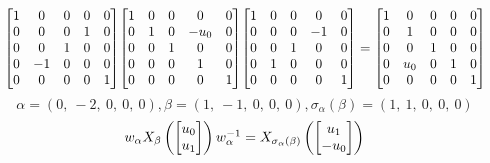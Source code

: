 \documentclass[11pt]{article}
\theoremstyle{definition}
\begin{document}
\[
\scaletoalign{\textwidth}{{\left[\begin{matrix}1 & 0 & 0 & 0 & 0\\0 & 0 & 0 & 1 & 0\\0 & 0 & 1 & 0 & 0\\0 & -1 & 0 & 0 & 0\\0 & 0 & 0 & 0 & 1\end{matrix}\right]} {\left[\begin{matrix}1 & 0 & 0 & 0 & 0\\0 & 1 & 0 & - u_{0} & 0\\0 & 0 & 1 & 0 & 0\\0 & 0 & 0 & 1 & 0\\0 & 0 & 0 & 0 & 1\end{matrix}\right]} {\left[\begin{matrix}1 & 0 & 0 & 0 & 0\\0 & 0 & 0 & -1 & 0\\0 & 0 & 1 & 0 & 0\\0 & 1 & 0 & 0 & 0\\0 & 0 & 0 & 0 & 1\end{matrix}\right]} = {\left[\begin{matrix}1 & 0 & 0 & 0 & 0\\0 & 1 & 0 & 0 & 0\\0 & 0 & 1 & 0 & 0\\0 & u_{0} & 0 & 1 & 0\\0 & 0 & 0 & 0 & 1\end{matrix}\right]}}
\]
\[
\alpha = \left( 0, \  -2, \  0, \  0, \  0\right), \beta = \left( 1, \  -1, \  0, \  0, \  0\right), \sigma_{\alpha}(\beta) = \left( 1, \  1, \  0, \  0, \  0\right)
\]
\[
\scaletoalign{\textwidth}{w_{\alpha} X_{\beta}\left(\left[\begin{matrix}u_{0}\\u_{1}\end{matrix}\right]\right) w_{\alpha}^{-1} = X_{\sigma_{\alpha}\left(\beta\right)}\left(\left[\begin{matrix}u_{1}\\- u_{0}\end{matrix}\right]\right)}
\]
\end{document}
